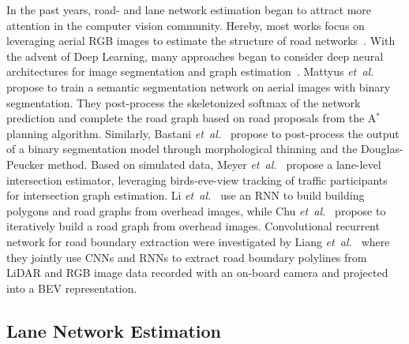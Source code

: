 \documentclass[letterpaper, 10 pt, conference]{ieeeconf}
\newcommand{\etal}{\emph{et~al.~}}
\begin{document}
In the past years, road- and lane network estimation began to attract more attention in the computer vision community. Hereby, most works focus on leveraging aerial RGB images to estimate the structure of road networks~\cite{marmanis2016semantic, mnih2010learning}. With the advent of Deep Learning, many approaches began to consider deep neural architectures for image segmentation and graph estimation~\cite{paz2015variational, bastani2018roadtracer,  chu2019neural, mattyus2017deeproadmapper, bai2018deep}. Mattyus \etal \cite{mattyus2017deeproadmapper} propose to train a semantic segmentation network on aerial images with binary segmentation. They post-process the skeletonized softmax of the network prediction and complete the road graph based on road proposals from the A$^*$ planning algorithm. Similarly, Bastani \etal \cite{bastani2018roadtracer} propose to post-process the output of a binary segmentation model through morphological thinning and the Douglas-Peucker method. Based on simulated data, Meyer \etal \cite{meyer2019anytime} propose a lane-level intersection estimator, leveraging birds-eve-view tracking of traffic participants for intersection graph estimation. Li \etal \cite{li2019topological} use an RNN to build building polygons and road graphs from overhead images, while Chu \etal \cite{chu2019neural} propose to iteratively build a road graph from overhead images. Convolutional recurrent network for road boundary extraction were investigated by Liang \etal \cite{liang2019convolutional} where they jointly use CNNs and RNNs to extract road boundary polylines from LiDAR and RGB image data recorded with an on-board camera and projected into a BEV representation.



\subsection{Lane Network Estimation}
\end{document}
